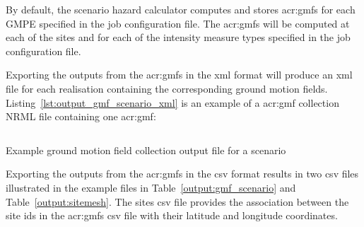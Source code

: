 By default, the scenario hazard calculator computes and stores
\glspl{acr:gmf} for each GMPE specified in the job configuration file. The
\glspl{acr:gmf} will be computed at each of the sites and for each of the
intensity measure types specified in the job configuration file.

Exporting the outputs from the \glspl{acr:gmf} in the xml format will produce
an xml file for each realisation containing the corresponding ground motion
fields. Listing~\ref{lst:output_gmf_scenario_xml} is an example of a \gls{acr:gmf}
collection NRML file containing one \gls{acr:gmf}:

\begin{listing}[htbp]
  \inputminted[firstline=1,firstnumber=1,fontsize=\footnotesize,frame=single,linenos,bgcolor=lightgray]{xml}{oqum/hazard/verbatim/output_gmf_scenario.xml}
  \caption{Example ground motion field collection output file for a scenario}
  \label{lst:output_gmf_scenario_xml}
\end{listing}

Exporting the outputs from the \glspl{acr:gmf} in the csv format results in
two csv files illustrated in the example files in
Table~\ref{output:gmf_scenario} and Table~\ref{output:sitemesh}. The sites csv
file provides the association between the site ids in the \glspl{acr:gmf} csv
file with their latitude and longitude coordinates.





